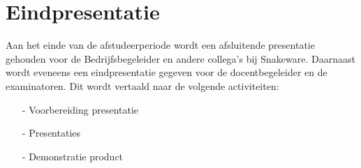 \section{Eindpresentatie}
Aan het einde van de afstudeerperiode wordt een afsluitende presentatie gehouden voor de Bedrijfsbegeleider en andere collega's bij Snakeware.
Daarnaast wordt eveneens een eindpresentatie gegeven voor de docentbegeleider en de examinatoren.
Dit wordt vertaald naar de volgende activiteiten:

\whitespace
\begin{itemize}
    \item[-] Voorbereiding presentatie
    \item[-] Presentaties
    \item[-] Demonstratie product
\end{itemize}
